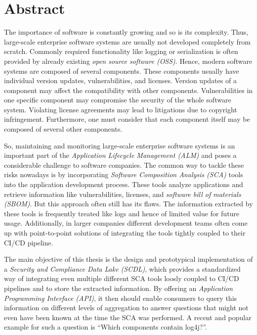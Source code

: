 
\titlespacing*{\chapter}{0pt}{0pt}{40pt}
\pagestyle{plain}
\chapter*{Abstract}
The importance of software is constantly growing and so is its complexity. Thus, large-scale enterprise software systems are usually not developed completely from scratch. Commonly required functionality like logging or serialization is often provided by already existing \textit{open source software (OSS)}. Hence, modern software systems are composed of several components. These components usually have individual version updates, vulnerabilities, and licenses. Version updates of a component may affect the compatibility with other components. Vulnerabilities in one specific component may compromise the security of the whole software system. Violating license agreements may lead to litigations due to copyright infringement. Furthermore, one must consider that each component itself may be composed of several other components.\par
So, maintaining and monitoring large-scale enterprise software systems is an important part of the \textit{Application Lifecycle Management (ALM)} and poses a considerable challenge to software companies. The common way to tackle these risks nowadays is by incorporating \textit{Software Composition Analysis (SCA)} tools into the application development process. These tools analyze applications and retrieve information like vulnerabilities, licenses, and \textit{software bill of materials (SBOM)}. But this approach often still has its flaws. The information extracted by these tools is frequently treated like logs and hence of limited value for future usage. Additionally, in larger companies different development teams often come up with point-to-point solutions of integrating the tools tightly coupled to their CI/CD pipeline.\par
The main objective of this thesis is the design and prototypical implementation of a \textit{Security and Compliance Data Lake (SCDL)}, which provides a standardized way of integrating even multiple different SCA tools loosly coupled to CI/CD pipelines and to store the extracted information. By offering an \textit{Application Programming Interface (API)}, it then should enable consumers to query this information on different levels of aggregation to answer questions that might not even have been known at the time the SCA was performed. A recent and popular example for such a question is \enquote{Which components contain log4j?}.\par
